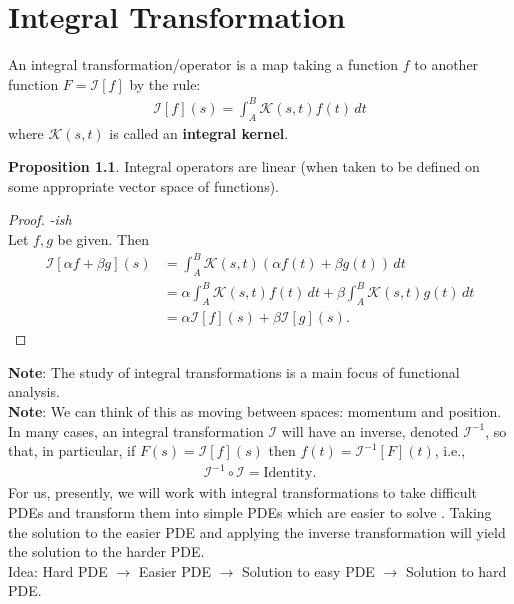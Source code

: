 \documentclass{book}
\theoremstyle{definition}
\newtheorem{prop}{Proposition}[section]
\newcommand{\I}{\mathcal{I}}
\newcommand{\K}{\mathcal{K}}
\begin{document}
\newpage


\chapter{Integral Transformation}
An integral transformation/operator is a map taking a function $f$ to another function $F = \I[f]$ by the rule:
\begin{align*}
\boxed{\I[f](s) = \int^B_A \K(s,t)f(t)\,dt}
\end{align*}
where $\K(s,t)$ is called an \textbf{integral kernel}.\\

\begin{prop}
	Integral operators are linear (when taken to be defined on some appropriate vector space of functions). 
	\begin{proof}\textit{-ish}\\
		
		Let $f,g$ be given. Then
		\begin{align*}
		\I[\alpha f+ \beta g](s) &= \int^B_A \K(s,t)\left(\alpha f(t) + \beta g(t)\right)\,dt\\
		&= \alpha \int^B_A \K(s,t)f(t)\,dt + \beta \int^B_A \K(s,t)g(t)\,dt\\
		&= \alpha\I[f](s) + \beta\I[g](s).
		\end{align*}
	\end{proof}
\end{prop}

\textbf{Note}: The study of integral transformations is a main focus of functional analysis. \\

\textbf{Note}: We can think of this as moving between spaces: momentum and position. \\

In many cases, an integral transformation $\I$ will have an inverse, denoted $\I^{-1}$, so that, in particular, if $F(s) = \I[f](s)$ then $f(t) = \I^{-1}[F](t)$, i.e.,
\begin{align*}
\I^{-1}\circ \I = \text{Identity}.
\end{align*}
For us, presently, we will work with integral transformations to take difficult PDEs and transform them into simple PDEs which are easier to solve . Taking the solution to the easier PDE and applying the inverse transformation will yield the solution to the harder PDE.\\

Idea: Hard PDE $\to$ Easier PDE $\to$ Solution to easy PDE $\to$ Solution to hard PDE.\\
\end{document}
